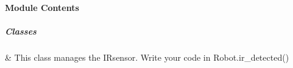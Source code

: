 \documentclass[letterpaper,10pt,english]{sphinxmanual}
\begin{document}
\sphinxstepscope


\subsubsection{}
\label{\detokenize{autoapi/robotlibrary/infrared/index:module-robotlibrary.infrared}}\label{\detokenize{autoapi/robotlibrary/infrared/index:robotlibrary-infrared}}\label{\detokenize{autoapi/robotlibrary/infrared/index::doc}}

\paragraph{Module Contents}
\label{\detokenize{autoapi/robotlibrary/infrared/index:module-contents}}

\subparagraph{Classes}
\label{\detokenize{autoapi/robotlibrary/infrared/index:classes}}

\begin{savenotes}\sphinxattablestart
\sphinxthistablewithglobalstyle
\sphinxthistablewithnovlinesstyle
\centering
\begin{tabulary}{\linewidth}[t]{}
\sphinxtoprule
\sphinxtableatstartofbodyhook
\sphinxAtStartPar
{\hyperref[\detokenize{autoapi/robotlibrary/infrared/index:robotlibrary.infrared.IR}]{}}
&
\sphinxAtStartPar
This class manages the IR\sphinxhyphen{}sensor. Write your code in Robot.ir\_detected()
\\
\sphinxbottomrule
\end{tabulary}
\sphinxtableafterendhook\par
\sphinxattableend\end{savenotes}
\end{document}
